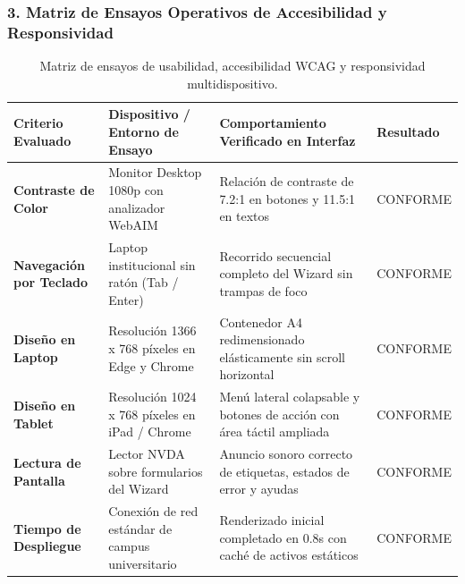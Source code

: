 \documentclass[12pt,a4paper]{article}
\begin{document}
\subsubsection*{3. Matriz de Ensayos Operativos de Accesibilidad y Responsividad}
\begin{table}[H]
\centering
\small
\renewcommand{\arraystretch}{1.2}
\begin{tabularx}{\textwidth}{|>{\hsize=0.55\hsize\centering\arraybackslash\bfseries\footnotesize}X|>{\hsize=1.25\hsize\raggedright\arraybackslash\footnotesize}X|>{\hsize=1.65\hsize\raggedright\arraybackslash\footnotesize}X|>{\hsize=0.55\hsize\centering\arraybackslash\footnotesize}X|}
\hline
\rowcolor{tableheader}
\textbf{Criterio Evaluado} & \textbf{Dispositivo / Entorno de Ensayo} & \textbf{Comportamiento Verificado en Interfaz} & \textbf{Resultado} \\
\hline
Contraste de Color & Monitor Desktop 1080p con analizador WebAIM & Relación de contraste de 7.2:1 en botones y 11.5:1 en textos & CONFORME \\
\hline
Navegación por Teclado & Laptop institucional sin ratón (Tab / Enter) & Recorrido secuencial completo del Wizard sin trampas de foco & CONFORME \\
\hline
Diseño en Laptop & Resolución 1366 x 768 píxeles en Edge y Chrome & Contenedor A4 redimensionado elásticamente sin scroll horizontal & CONFORME \\
\hline
Diseño en Tablet & Resolución 1024 x 768 píxeles en iPad / Chrome & Menú lateral colapsable y botones de acción con área táctil ampliada & CONFORME \\
\hline
Lectura de Pantalla & Lector NVDA sobre formularios del Wizard & Anuncio sonoro correcto de etiquetas, estados de error y ayudas & CONFORME \\
\hline
Tiempo de Despliegue & Conexión de red estándar de campus universitario & Renderizado inicial completado en 0.8s con caché de activos estáticos & CONFORME \\
\hline
\end{tabularx}
\caption{Matriz de ensayos de usabilidad, accesibilidad WCAG y responsividad multidispositivo.}
\end{table}
\end{document}
